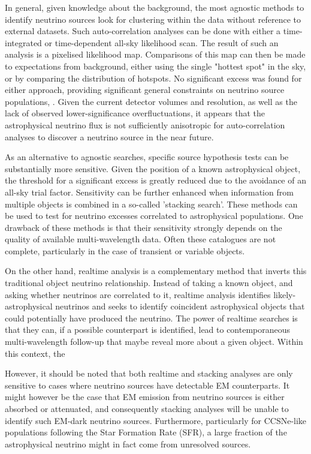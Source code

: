\documentclass[]{article}
\begin{document}
In general, given knowledge about the background, the most agnostic methods to identify neutrino sources look for clustering within the data without reference to external datasets. Such auto-correlation analyses can be done with either a time-integrated or time-dependent all-sky likelihood scan. The result of such an analysis is a pixelised likelihood map. Comparisons of this map can then be made to expectations from background, either using the single "hottest spot" in the sky, or by comparing the distribution of hotspots. No significant excess was found for either approach, providing significant general constraints on neutrino source populations, . Given the current detector volumes and resolution, as well as the lack of observed lower-significance overfluctuations, it appears that the astrophysical neutrino flux is not sufficiently anisotropic for auto-correlation analyses to discover a neutrino source in the near future.

As an alternative to agnostic searches, specific source hypothesis tests can be substantially more sensitive. Given the position of a known astrophysical object, the threshold for a significant excess is greatly reduced due to the avoidance of an all-sky trial factor. Sensitivity can be further enhanced when information from multiple objects is combined in a so-called 'stacking search'. These methods can be used to test for neutrino excesses correlated to astrophysical populations. One drawback of these methods is that their sensitivity strongly depends on the quality of available multi-wavelength data. Often these catalogues are not complete, particularly in the case of transient or variable objects. 

On the other hand, realtime analysis is a complementary method that inverts this traditional object neutrino relationship. Instead of taking a known object, and asking whether neutrinos are correlated to it, realtime analysis identifies likely-astrophysical neutrinos and seeks to identify coincident astrophysical objects that could potentially have produced the neutrino. The power of realtime searches is that they can, if a possible counterpart is identified, lead to contemporaneous multi-wavelength follow-up that maybe reveal more about a given object. Within this context, the 

However, it should be noted that both realtime and stacking analyses are only sensitive to cases where neutrino sources have detectable EM counterparts. It might however be the case that EM emission from neutrino sources is either absorbed or attenuated, and consequently stacking analyses will be unable to identify such EM-dark neutrino sources. Furthermore, particularly for CCSNe-like populations following the Star Formation Rate (SFR), a large fraction of the astrophysical neutrino might in fact come from unresolved sources.
\end{document}
